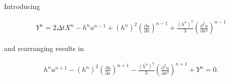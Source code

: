 \documentclass[SingleSpace,12pt,Proceedings]{Serre_ASCE}
\begin{document}
Introducing
\begin{linenomath*}
\begin{gather*}
Y^n = 2\Delta tX^{n} - h^{n}u^{n-1} + \left(h^{n}\right)^2\left(\frac{\partial u}{\partial x}\right)^{n-1} + \frac{\left(h^{n}\right)^3}{3}\left(\frac{\partial^2 u}{\partial x^2}\right)^{n-1}
\label{eq:expandfactor Xp}
\end{gather*}
\end{linenomath*}
and rearranging results in
\begin{linenomath*}
\begin{gather*}
h^{n}u^{n+1} - \left(h^{n}\right)^2 \left(\frac{\partial u}{\partial x}\right)^{n+1} - \frac{\left(h^{n}\right)^3}{3}\left(\frac{\partial^2 u}{\partial x^2}\right)^{n+1}  + Y^n   =0 . 
\label{eq:expandedutdisc2}
\end{gather*}
\end{linenomath*}
\end{document}
